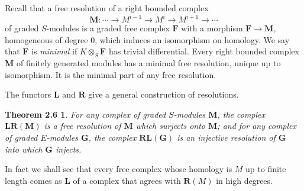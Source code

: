 \documentclass{tran-l}
\newcommand{\FF}{\mathbf{F}}
\newcommand{\GG}{\mathbf{G}}
\newcommand{\LL}{\mathbf{L}}
\newcommand{\MM}{\mathbf{M}}
\newcommand{\RR}{\mathbf{R}}
\theoremstyle{plain}
\newtheorem*{theorem8}{Theorem 2.6}
\theoremstyle{remark}
\theoremstyle{definition}
\begin{document}
Recall that a free resolution of a right bounded complex
\begin{equation*}\MM : \cdots \to M^{i-1}\to M^{i}\to M^{i+1}\to \cdots \end{equation*}
of graded $S$-modules is a graded free complex $\FF $ with a
morphism $\FF \to \MM $, homogeneous of degree 0, which
induces an isomorphism on homology.
We say that $\FF $
is {\em minimal\/} if $K\otimes _{S}\FF $
has trivial differential. Every right bounded complex
$\MM $
of finitely generated modules has a minimal free resolution,
unique up to isomorphism. It is the minimal part of any free resolution.

The functors $\LL $ and $\RR $ give a general construction of resolutions.
\begin{theorem8}
For any complex of graded $S$-modules $\MM $, the complex
$\LL \RR (\MM )
$
is a free resolution of $\MM $ which surjects onto $\MM $; and
for any complex of graded $E$-modules $\GG $,
the complex
$\RR \LL (\GG )
$
is an injective resolution of $\GG $ into which $\GG $ injects.
\end{theorem8}


In fact we shall see that every free complex whose homology is $M$ up to finite length
comes as $\LL $ of a complex that agrees with $\RR (M)$ in high degrees.
\end{document}
